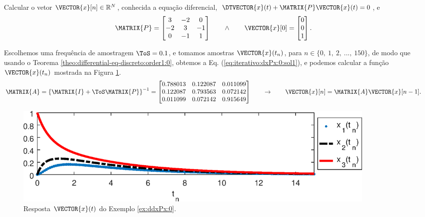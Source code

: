 \begin{example}
\label{ex:iterativo:dxPx:0}
Calcular o vetor $\VECTOR{x}[n] \in \mathbb{R}^{N}$,
conhecida a equação diferencial, $\DTVECTOR{x}(t) + \MATRIX{P} \VECTOR{x}(t)=0$, e
\begin{equation}
\MATRIX{P}=
\begin{bmatrix}
3 & -2 & 0\\
-2 & 3 & -1\\
0 & -1 & 1
\end{bmatrix}
\qquad \wedge \qquad
\VECTOR{x}[0]=
\begin{bmatrix}
0\\
0\\
1
\end{bmatrix}.
\end{equation}
\end{example}


\begin{SolutionT}
\label{ex:iterativo:dxPx:0:sol1}
Escolhemos uma frequência de amostragem $\ToS=0.1$, e
tomamos amostras $\VECTOR{x}(t_n)$, para $n \in \{0,~ 1,~ 2,~ ...,~ 150\}$, 
de modo que usando o Teorema \ref{theo:differential-eq-discreto:order1:0}, 
obtemos a Eq. (\ref{eq:iterativo:dxPx:0:sol1}),
e podemos calcular a função $\VECTOR{x}(t_n)$ mostrada na Figura \ref{fig:ex:iterativo:dxPx:0}.
\begin{equation}\label{eq:iterativo:dxPx:0:sol1}
\MATRIX{A}=
\left\{\MATRIX{I} + \ToS \MATRIX{P}\right\}^{-1}=
\begin{bmatrix}
   0.788013 & 0.122087 & 0.011099 \\
   0.122087 & 0.793563 & 0.072142 \\
   0.011099 & 0.072142 & 0.915649 
\end{bmatrix}
\qquad \rightarrow \qquad
\VECTOR{x}[n]=\MATRIX{A} \VECTOR{x}[n-1].
\end{equation}

\end{SolutionT}
     \begin{figure}[!h]
         \centering
         \includegraphics[width=0.89\textwidth]{chapters/differential-eq-discreto/mfiles/primeiroorder/primeirooder1.eps}
         \caption{Resposta $\VECTOR{x}(t)$ do Exemplo \ref{ex:ddxPx:0}.}
         \label{fig:ex:iterativo:dxPx:0}
     \end{figure}
